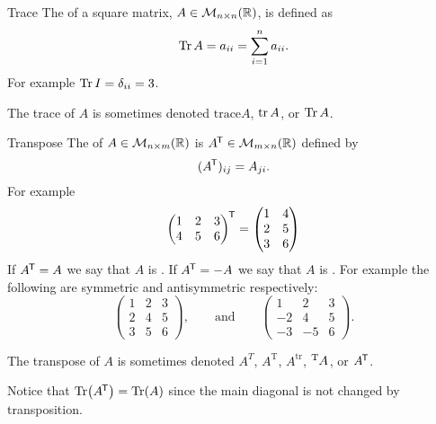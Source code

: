 \documentclass[a4paper]{article}
\newcommand{\nxmMatrices}[3]{\mathcal{M}_{{#1}\times{#2}}({#3})}
\renewcommand{\ident}{I}
\begin{document}
    \begin{definition}{Trace}{}
        The  of a square matrix, \(A \in\nxmMatrices{n}{n}{\reals}\), is defined as
        \[\Tr A = a_{ii} = \sum_{i=1}^{n} a_{ii}.\]
        For example \(\Tr \ident = \delta_{ii} = 3\).
    \end{definition}
    \begin{notation*}{}
        The trace of \(A\) is sometimes denoted \(\mathrm{trace}A\), \(\tr A\), or \(\Tr A\).
    \end{notation*}
    \begin{definition}{Transpose}{}
        The  of \(A\in\nxmMatrices{n}{m}{\reals}\) is \(A\trans\in\nxmMatrices{m}{n}{\reals}\) defined by
        \[(A^{\mkern-1.5mu\mathsf{T}})_{ij} = A_{ji}.\]
        For example
        \[
            \begin{pmatrix}
                1 & 2 & 3\\
                4 & 5 & 6
            \end{pmatrix}
            ^{\mkern-1.5mu\mathsf{T}}
            =
            \begin{pmatrix}
                1 & 4\\
                2 & 5\\
                3 & 6
            \end{pmatrix}
        \]
        If \(A^{\mkern-1.5mu\mathsf{T}} = A\) we say that \(A\) is .
        If \(A^{\mkern-1.5mu\mathsf{T}} = -A\) we say that \(A\) is .
        For example the following are symmetric and antisymmetric respectively:
        \[
            \begin{pmatrix}
                1 & 2 & 3\\
                2 & 4 & 5\\
                3 & 5 & 6
            \end{pmatrix}
            , \qquad\text{and}\qquad
            \begin{pmatrix}
                1 & 2 & 3\\
                -2 & 4 & 5\\
                -3 & -5 & 6
            \end{pmatrix}
            .
        \]
    \end{definition}
    \begin{notation}
        The transpose of \(A\) is sometimes denoted \(A^T\), \(A^{\mathrm{T}}\), \(A^{\mathrm{tr}}\), \(\tensor[^{\mathrm{T}}]{A}{}\), or \(A^{\mkern-1.5mu\mathsf{T}}\).
    \end{notation}
    Notice that \(\Tr(A^{\mkern-1.5mu\mathsf{T}}) = \Tr(A)\) since the main diagonal is not changed by transposition.
\end{document}
